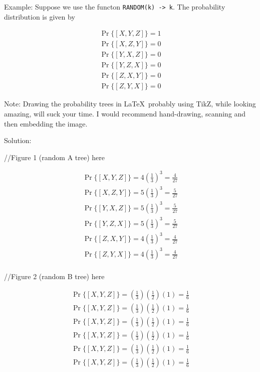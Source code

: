 \documentclass[12pt, letterpaper]{article}
\begin{document}
\bigskip
Example: Suppose we use the functon \texttt{RANDOM(k) -> k}. The probability distribution is given by

{\small
\begin{align*}
\Pr\{ [X,Y,Z] \} = 1 \\
\Pr\{ [X,Z,Y] \} = 0 \\
\Pr\{ [Y,X,Z] \} = 0 \\
\Pr\{ [Y,Z,X] \} = 0 \\
\Pr\{ [Z,X,Y] \} = 0 \\
\Pr\{ [Z,Y,X] \} = 0
\end{align*}
}


Note: Drawing the probability trees in \LaTeX\, probably using TikZ, while looking amazing, will suck your time. I would recommend hand-drawing, scanning and then embedding the image. 

Solution: 

//Figure 1 (random A tree) here

{\small
\begin{align*}
\Pr\{ [X,Y,Z] \} = 4\left(\frac{1}{3} \right)^3 = \frac{4}{27} \\
\Pr\{ [X,Z,Y] \} = 5\left(\frac{1}{3} \right)^3 = \frac{5}{27} \\
\Pr\{ [Y,X,Z] \} = 5\left(\frac{1}{3} \right)^3 = \frac{5}{27} \\
\Pr\{ [Y,Z,X] \} = 5\left(\frac{1}{3} \right)^3 = \frac{5}{27} \\
\Pr\{ [Z,X,Y] \} = 4\left(\frac{1}{3} \right)^3 = \frac{4}{27} \\
\Pr\{ [Z,Y,X] \} = 4\left(\frac{1}{3} \right)^3 = \frac{4}{27} \\
\end{align*}
}

//Figure 2 (random B tree) here

{\small
\begin{align*}
\Pr\{ [X,Y,Z] \} = \left(\frac{1}{3} \right)\left(\frac{1}{2} \right)(1) = \frac{1}{6} \\
\Pr\{ [X,Y,Z] \} = \left(\frac{1}{3} \right)\left(\frac{1}{2} \right)(1) = \frac{1}{6} \\
\Pr\{ [X,Y,Z] \} = \left(\frac{1}{3} \right)\left(\frac{1}{2} \right)(1) = \frac{1}{6} \\
\Pr\{ [X,Y,Z] \} = \left(\frac{1}{3} \right)\left(\frac{1}{2} \right)(1) = \frac{1}{6} \\
\Pr\{ [X,Y,Z] \} = \left(\frac{1}{3} \right)\left(\frac{1}{2} \right)(1) = \frac{1}{6} \\
\Pr\{ [X,Y,Z] \} = \left(\frac{1}{3} \right)\left(\frac{1}{2} \right)(1) = \frac{1}{6} \\
\end{align*}
}
\end{document}
